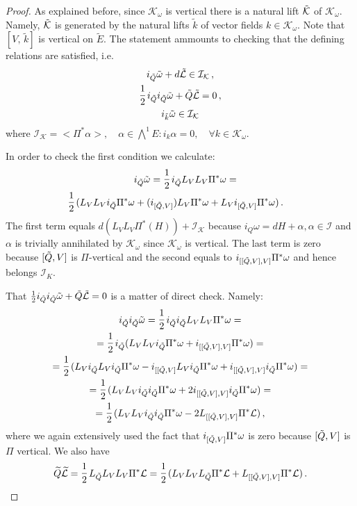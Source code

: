 \documentclass[10pt,a4paper]{amsart}
\def\cI{\mathcal{I}}
\def\cK{\mathcal{K}}
\def\cL{\mathcal{L}}
\newcommand{\commut}[2]{[#1{,}\,#2]}
\newcommand{\ffrac}[2]{\raisebox{.5pt}%
  {\footnotesize$\displaystyle\frac{#1}{#2}$}\kern1pt}
\newcommand{\half}{\mathchoice{%
    \ffrac{1}{2}}{\frac{1}{2}}{\frac{1}{2}}{\frac{1}{2}}}
\renewcommand{\tilde}{\widetilde}
\begin{document}
\begin{proof} 
As explained before, since $\cK_{\omega}$ is vertical there is a natural lift $\Tilde{\cK}$ of $\cK_\omega$. Namely, $\Tilde{\cK}$ is generated by the natural lifts $\tilde k$ of  vector fields $k \in \cK_\omega$. Note that $\commut{V}{\tilde k}$ is vertical on $\tilde E$.  The statement ammounts to checking that the defining relations are satisfied, i.e. 
\begin{equation}
    \begin{gathered}
        i_{\Tilde{Q}}\Tilde{\omega} + d\Tilde{\cL} \in \cI_{\cK}\,, \\
        \half i_{\Tilde{Q}}i_{\Tilde{Q}}\Tilde{\omega} + \Tilde{Q}\Tilde{\cL} = 0 \,,
        \\
        i_{\Tilde{k}}\Tilde{\omega} \in \cI_{\cK}
\end{gathered}
\end{equation}
where $\cI_{\cK} = <\Pi^*\alpha>, \quad \alpha\in \bigwedge^1E: i_k\alpha = 0, \quad \forall k\in \cK_\omega $.

In order to check the first condition we calculate:
\begin{multline}
   \quad i_{\Tilde{Q}}\Tilde{\omega} = 
    \half i_{\Tilde{Q}}L_VL_V \Pi^* \omega = \\ \half(L_V L_V i_{\Tilde{Q}} \Pi^*\omega +(i_{[\Tilde{Q},V]})L_V \Pi^*\omega +  L_V i_{[\Tilde{Q},V]}\Pi^*\omega) \,.\quad 
\end{multline}
The first term equals $d(L_VL_V\Pi^*(H)) + \cI_{\cK}$ because $i_Q \omega = dH + \alpha, \alpha \in \cI$ and $\alpha$ is trivially annihilated by $\cK_\omega$ since $\cK_\omega$ is vertical.  
The last term is zero because $[\Tilde{Q},V]$ is $\Pi$-vertical and the second equals to $i_{[[\Tilde{Q},V],V]}\Pi^*\omega$ and hence belongs  $\cI_K$. 

That $\half i_{\Tilde{Q}}i_{\Tilde{Q}}\Tilde{\omega} + \Tilde{Q}\Tilde{\cL} = 0$ is a matter of direct check. Namely:
\begin{multline}
    i_{\Tilde{Q}}i_{\Tilde{Q}}\Tilde{\omega}  = \half i_{\Tilde{Q}}i_{\Tilde{Q}}L_V L_V \Pi^*\omega = \\= \half i_{\Tilde{Q}}( L_V L_V i_{\Tilde{Q}} \Pi^*\omega + i_{[[\Tilde{Q},V],V]}\Pi^*\omega) = \\ =  \half (L_V i_{\Tilde{Q}} L_V i_{\Tilde{Q}} \Pi^*\omega -i_{[[\Tilde{Q},V]} L_V i_{\Tilde{Q}} \Pi^*\omega + i_{[[\Tilde{Q},V],V]} i_{\Tilde{Q}}\Pi^*\omega ) = \\ = \half(L_V L_V i_{\Tilde{Q}}i_{\Tilde{Q}} \Pi^*\omega  + 2i_{[[\Tilde{Q},V],V]} i_{\Tilde{Q}}\Pi^*\omega )  = \\ = \half (L_V L_V i_{\Tilde{Q}}i_{\Tilde{Q}} \Pi^*\omega  - 2L_{[[\Tilde{Q},V],V]}\Pi^*\cL) \,,
\end{multline}
where we again extensively used the fact that  $i_{[\Tilde{Q},V]}\Pi^*\omega$ is zero because $[\Tilde{Q},V]$ is $\Pi$ vertical. We also have 
\begin{equation}
    \tilde{Q}\tilde{\cL} = \half L_{\Tilde{Q}}L_V L_V \Pi^*\cL = \half (L_V L_V L_{\Tilde{Q}}\Pi^*\cL + L_{[[\Tilde{Q},V],V]}\Pi^*\cL) \,.
\end{equation}


\end{proof}
\end{document}
